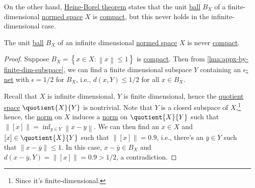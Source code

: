 On the other hand, \hyperref[thm:Heine-Borel]{Heine-Borel theorem} states that the unit \hyperref[def:ball]{ball} \(B_X\) of a finite-dimensional \hyperref[def:normed-vector-space]{normed space} \(X\) is \hyperref[def:compact]{compact}, but this never holds in the infinite-dimensional case.

\begin{theorem}\label{thm:Riesz}
	The unit \hyperref[def:ball]{ball} \(B_X\) of an infinite dimensional \hyperref[def:normed-vector-space]{normed space} \(X\) is never \hyperref[def:compact]{compact}.
\end{theorem}
\begin{proof}
	Suppose \(B_X= \left\{ x\in X\colon \left\lVert x\right\rVert \leq 1 \right\} \) is \hyperref[def:compact]{compact}. Then from \autoref{lma:appx-by-finite-dim-subspace}, we can find a finite dimensional subspace \(Y\) containing an \hyperref[def:eps-net]{\(\epsilon\)-net} with \(\epsilon = 1 / 2\)  for \(B_X\), i.e., \(d(x, Y) \leq 1 / 2\) for all \(x\in B_X\).

	Recall that \(X\) is infinite dimensional, \(Y\) is finite dimensional, hence the \hyperref[def:quotient-space]{quotient space} \(\quotient{X}{Y} \) is nontrivial. Note that \(Y\) is a closed subspace of \(X\),\footnote{Since it's finite-dimensional.} hence, the \hyperref[def:norm]{norm} on \(X\) induces a \hyperref[def:norm]{norm} on \(\quotient{X}{Y}\) such that \(\left\lVert [x]\right\rVert = \inf _{y\in Y} \left\lVert x - y\right\rVert\). We can then find an \(x\in X\) and \([x]\in \quotient{X}{Y} \) such that \(\left\lVert [x]\right\rVert = 0.9\), i.e., there's an \(\overline{y} \in Y\) such that \(\left\lVert x - \overline{y} \right\rVert \leq 1\). In this case, \(x - \overline{y} \in B_X\) and \(d(x-\overline{y} , Y) = \lVert [x] \rVert = 0.9 > 1 / 2\), a contradiction.
\end{proof}